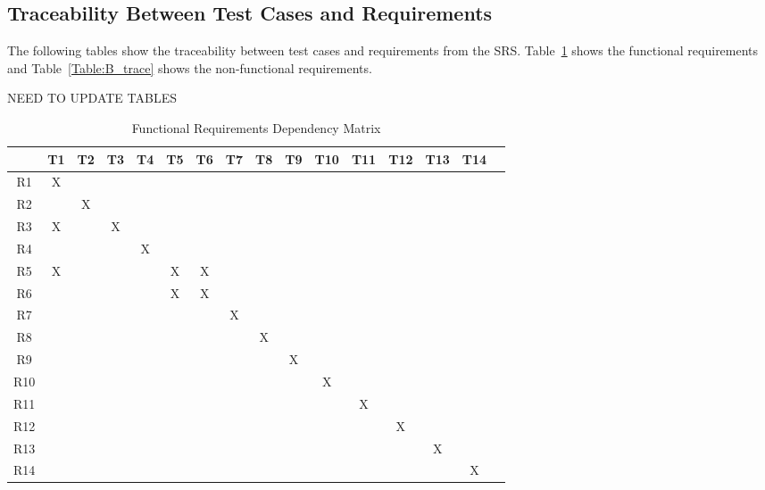 \documentclass[12pt, titlepage]{article}
\begin{document}
\subsection{Traceability Between Test Cases and Requirements}

The following tables show the traceability between test cases and requirements from the SRS. Table~\ref{Table:A_trace} shows the functional requirements and Table~\ref{Table:B_trace} shows the non-functional requirements.

NEED TO UPDATE TABLES

\begin{table}[H]
  \centering
  \caption{Functional Requirements Dependency Matrix}
  \begin{tabular}{|c|c|c|c|c|c|c|c|c|c|c|c|c|c|c|c|}
  \hline
    & T1 & T2 & T3 & T4 & T5 & T6 & T7 & T8 & T9 & T10 & T11 & T12 & T13 & T14\\
  \hline
  R1      &X & & & & & & & & & & & & & \\ 
  \hline
  R2      & &X & & & & & & & & & & & & \\ 
  \hline
  R3      &X & &X & & & & & & & & & & & \\ 
  \hline
  R4      & & & &X & & & & & & & & & & \\ 
  \hline
  R5      &X & & & &X &X & & & & & & & & \\ 
  \hline
  R6      & & & & &X &X & & & & & & & & \\ 
  \hline
  R7      & & & & & & &X & & & & & & & \\ 
  \hline
  R8      & & & & & & & &X & & & & & & \\ 
  \hline
  R9      & & & & & & & & &X & & & & & \\ 
  \hline
  R10      & & & & & & & & & &X & & & & \\ 
  \hline
  R11      & & & & & & & & & & &X & & & \\ 
  \hline
  R12      & & & & & & & & & & & &X & & \\ 
  \hline
  R13      & & & & & & & & & & & & &X & \\ 
  \hline
  R14      & & & & & & & & & & & & & &X \\ 
  \hline
  \end{tabular}
  
  \label{Table:A_trace}
  \end{table}
  
\end{document}
